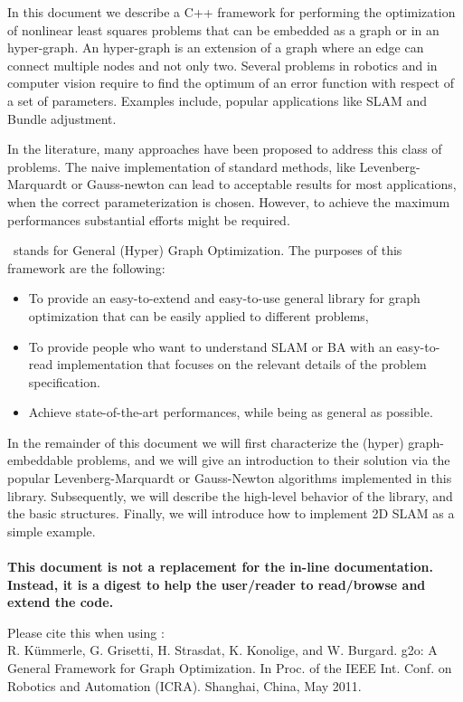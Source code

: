 \documentclass[a4paper]{article}
\begin{document}
In this document we describe a C++ framework for performing the
optimization of nonlinear least squares problems that can be embedded
as a graph or in an hyper-graph. An hyper-graph is an extension of a
graph where an edge can connect multiple nodes and not only two.
Several problems in robotics and in computer vision require to find
the optimum of an error function with respect of a set of parameters.
Examples include, popular applications like SLAM and Bundle
adjustment.

In the literature, many approaches have been proposed to address this
class of problems. The naive implementation of standard methods, like
Levenberg-Marquardt or Gauss-newton can lead to acceptable results for
most applications, when the correct parameterization is
chosen. However, to achieve the maximum performances substantial
efforts might be required.

\gopt\ stands for General (Hyper) Graph Optimization. The purposes of
this framework are the following:
\begin{itemize}
\item To provide an easy-to-extend and easy-to-use general library for 
  graph optimization that can be easily applied to different problems,
\item To provide people who want to understand SLAM or BA with an
  easy-to-read implementation that focuses on the relevant details of
  the problem specification.
\item Achieve state-of-the-art performances, 
  while being as general as possible.
\end{itemize}

In the remainder of this document we will first characterize the
(hyper) graph-embeddable problems, and we will give an introduction to
their solution via the popular Levenberg-Marquardt or Gauss-Newton
algorithms implemented in this library.  Subsequently, we will
describe the high-level behavior of the library, and the basic
structures.  Finally, we will introduce how to implement 2D SLAM as a
simple example.\\
\vspace{.5cm}\\
\textbf{This document is not a replacement for the
  in-line documentation.  Instead, it is a digest to help the
  user/reader to read/browse and extend the code.}

  \vspace{.5cm}
\noindent Please cite this when using \gopt:\\
R. K\"ummerle, G. Grisetti, H. Strasdat, K. Konolige, and W. Burgard.
g2o: A General Framework for Graph Optimization. 
In Proc. of the IEEE Int. Conf. on Robotics and Automation (ICRA). Shanghai, China, May 2011. 
\end{document}
